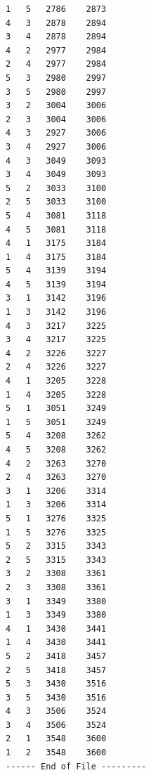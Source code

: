 \documentclass[a4paper,12pt]{report}      %
\begin{document}
\begin{verbatim}
1	5	2786	2873
4	3	2878	2894
3	4	2878	2894
4	2	2977	2984
2	4	2977	2984
5	3	2980	2997
3	5	2980	2997
3	2	3004	3006
2	3	3004	3006
4	3	2927	3006
3	4	2927	3006
4	3	3049	3093
3	4	3049	3093
5	2	3033	3100
2	5	3033	3100
5	4	3081	3118
4	5	3081	3118
4	1	3175	3184
1	4	3175	3184
5	4	3139	3194
4	5	3139	3194
3	1	3142	3196
1	3	3142	3196
4	3	3217	3225
3	4	3217	3225
4	2	3226	3227
2	4	3226	3227
4	1	3205	3228
1	4	3205	3228
5	1	3051	3249
1	5	3051	3249
5	4	3208	3262
4	5	3208	3262
4	2	3263	3270
2	4	3263	3270
3	1	3206	3314
1	3	3206	3314
5	1	3276	3325
1	5	3276	3325
5	2	3315	3343
2	5	3315	3343
3	2	3308	3361
2	3	3308	3361
3	1	3349	3380
1	3	3349	3380
4	1	3430	3441
1	4	3430	3441
5	2	3418	3457
2	5	3418	3457
5	3	3430	3516
3	5	3430	3516
4	3	3506	3524
3	4	3506	3524
2	1	3548	3600
1	2	3548	3600
------ End of File ---------

\end{verbatim}
\end{document}
